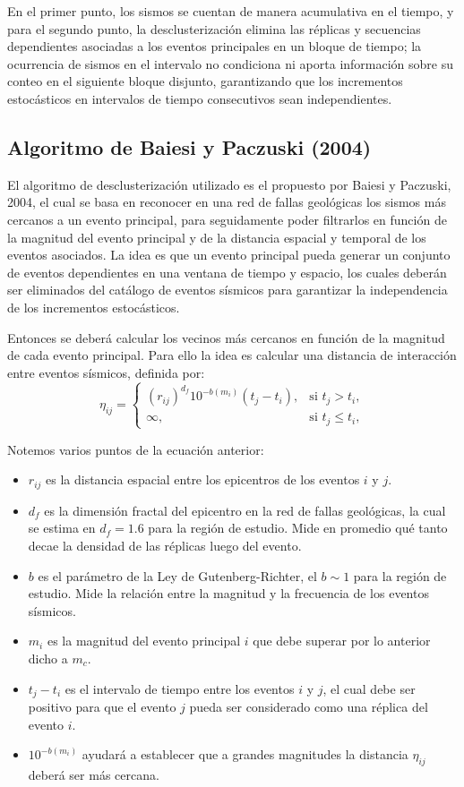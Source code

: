 En el primer punto, los sismos se cuentan de manera acumulativa en el tiempo, y para el segundo punto, la desclusterización elimina las réplicas y secuencias dependientes asociadas a los eventos principales en un bloque de tiempo; la ocurrencia de sismos en el intervalo no condiciona ni aporta información sobre su conteo en el siguiente bloque disjunto, 
garantizando que los incrementos estocásticos en intervalos de tiempo consecutivos sean independientes.

\subsection{Algoritmo de Baiesi y Paczuski (2004)}
El algoritmo de desclusterización utilizado es el propuesto por Baiesi y Paczuski, 2004, el cual se basa en reconocer en una red de fallas geológicas los sismos más cercanos a un evento principal, para seguidamente poder filtrarlos en función 
de la magnitud del evento principal y de la distancia espacial y temporal de los eventos asociados. La idea es que un evento principal pueda generar un conjunto de eventos dependientes en una ventana de tiempo y espacio, los cuales deberán ser
eliminados del catálogo de eventos sísmicos para garantizar la independencia de los incrementos estocásticos.

Entonces se deberá calcular los vecinos más cercanos en función de la magnitud de cada evento principal. Para ello la idea es calcular una distancia de interacción entre eventos sísmicos, definida por:
\begin{equation}
    \eta_{ij} = \begin{cases}
        (r_{ij})^{d_f}10^{-b(m_i)}(t_j - t_i), & \text{si } t_j > t_i, \\
        \infty, & \text{si } t_j \leq t_i,
    \end{cases}
\end{equation}

Notemos varios puntos de la ecuación anterior:
\begin{itemize}
    \item $r_{ij}$ es la distancia espacial entre los epicentros de los eventos $i$ y $j$.
    \item $d_f$ es la dimensión fractal del epicentro en la red de fallas geológicas, la cual se estima en $d_f = 1.6$ para la región de estudio. Mide en promedio qué tanto decae la densidad de las réplicas luego del evento.
    \item $b$ es el parámetro de la Ley de Gutenberg-Richter, el $b \sim 1$ para la región de estudio. Mide la relación entre la magnitud y la frecuencia de los eventos sísmicos.
    \item $m_i$ es la magnitud del evento principal $i$ que debe superar por lo anterior dicho a $m_c$.
    \item $t_j - t_i$ es el intervalo de tiempo entre los eventos $i$ y $j$, el cual debe ser positivo para que el evento $j$ pueda ser considerado como una réplica del evento $i$.
    \item $10^{-b(m_i)}$ ayudará a establecer que a grandes magnitudes la distancia $\eta_{ij}$ deberá ser más cercana.
\end{itemize}

